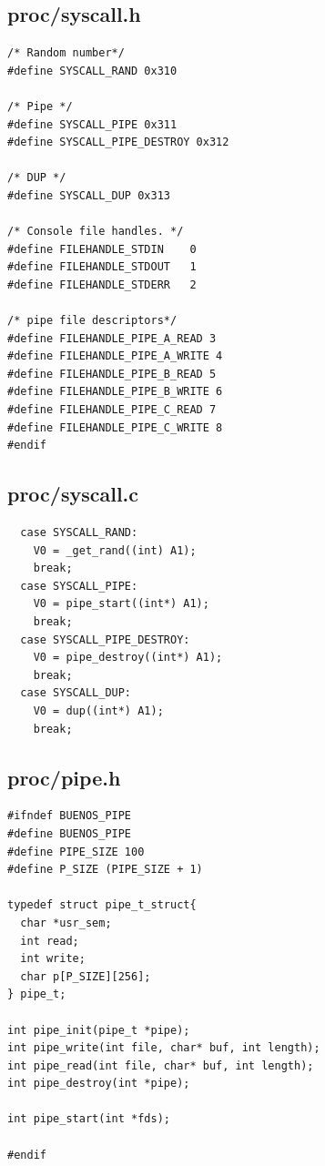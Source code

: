 \documentclass[a4paper,12pt,danish]{report}
\begin{document}
\subsection{proc/syscall.h}
\begin{verbatim}
/* Random number*/
#define SYSCALL_RAND 0x310

/* Pipe */
#define SYSCALL_PIPE 0x311
#define SYSCALL_PIPE_DESTROY 0x312

/* DUP */
#define SYSCALL_DUP 0x313

/* Console file handles. */
#define FILEHANDLE_STDIN    0
#define FILEHANDLE_STDOUT   1
#define FILEHANDLE_STDERR   2

/* pipe file descriptors*/
#define FILEHANDLE_PIPE_A_READ 3
#define FILEHANDLE_PIPE_A_WRITE 4
#define FILEHANDLE_PIPE_B_READ 5
#define FILEHANDLE_PIPE_B_WRITE 6
#define FILEHANDLE_PIPE_C_READ 7
#define FILEHANDLE_PIPE_C_WRITE 8
#endif

\end{verbatim}
\subsection{proc/syscall.c}
\begin{verbatim}
  case SYSCALL_RAND:
    V0 = _get_rand((int) A1);
    break;
  case SYSCALL_PIPE:
    V0 = pipe_start((int*) A1);
    break;
  case SYSCALL_PIPE_DESTROY:
    V0 = pipe_destroy((int*) A1);
    break;
  case SYSCALL_DUP:
    V0 = dup((int*) A1);
    break;

\end{verbatim}

\subsection{proc/pipe.h}
\begin{verbatim}
#ifndef BUENOS_PIPE
#define BUENOS_PIPE
#define PIPE_SIZE 100
#define P_SIZE (PIPE_SIZE + 1)

typedef struct pipe_t_struct{
  char *usr_sem;
  int read;
  int write;
  char p[P_SIZE][256];
} pipe_t;

int pipe_init(pipe_t *pipe);
int pipe_write(int file, char* buf, int length);
int pipe_read(int file, char* buf, int length);
int pipe_destroy(int *pipe);

int pipe_start(int *fds);

#endif
\end{verbatim}
\end{document}
